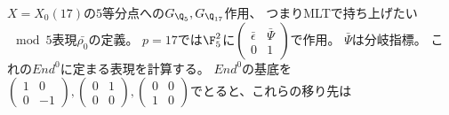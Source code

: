 \documentclass{jsarticle}
\begin{document}
$X=X_0(17)$の$5$等分点への$G_{\Q_5}, G_{\Q_{17}}$作用、
つまりMLTで持ち上げたい$\mod 5$表現$\bar{\rho_0}$の定義。
$p=17$では$\F_5^2$に$\begin{pmatrix}\bar{\epsilon}&\bar{\Psi}\\0&1\end{pmatrix}$で作用。
$\bar{\Psi}$は分岐指標。
これの$End^0$に定まる表現を計算する。
$End^0$の基底を$\begin{pmatrix}1&0\\0&-1\end{pmatrix}, \begin{pmatrix}0&1\\0&0\end{pmatrix}, \begin{pmatrix}0&0\\1&0\end{pmatrix}$でとると、これらの移り先は
\end{document}
